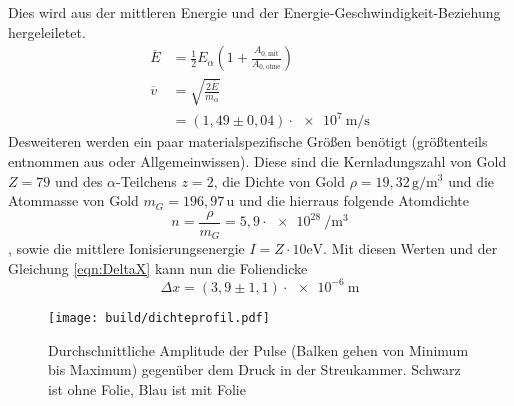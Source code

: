 Dies wird aus der mittleren Energie und der Energie-Geschwindigkeit-Beziehung hergeleiletet.
\begin{align}
  \overline{E} &= \frac{1}{2} E_{\alpha}\left(1 + \frac{A_{0,\text{mit}}}{A_{0,\text{ohne}}} \right)\\
  \overline{v} &= \sqrt{\frac{2\overline{E}}{m_{\alpha}}}\\
               &= (1,49 \pm 0,04)\cdot\SI{e+7}{\meter\per\second}
\end{align}
Desweiteren werden ein paar materialspezifische Größen benötigt (größtenteils entnommen aus \cite{Gold} oder Allgemeinwissen).
Diese sind die Kernladungszahl von Gold $Z=79$ und des $\alpha$-Teilchens $z=2$, die Dichte von Gold $\rho=19,32\, \si{\gram\per\meter\cubed}$
und die Atommasse von Gold $m_G=196,97\,\text{u}$ und die hierraus folgende Atomdichte
\begin{equation}
  n=\frac{\rho}{m_G}=5,9\cdot\SI{e+28}{\per\meter\cubed}
\end{equation}
, sowie die mittlere Ionisierungsenergie $I=Z\cdot 10\si{\electronvolt}$.
Mit diesen Werten und der Gleichung \eqref{eqn:DeltaX} kann nun die Foliendicke
\begin{equation}
  \Delta x = (3,9 \pm 1,1)\cdot\SI{e-6}{\meter}
\end{equation}

\begin{figure}
  \centering
  \texttt{[image: build/dichteprofil.pdf]}
  \caption{Durchschnittliche Amplitude der Pulse (Balken gehen von Minimum bis Maximum) gegenüber dem Druck in der Streukammer. Schwarz ist ohne Folie, Blau ist mit Folie}
  \label{fig:dichteprofil}
\end{figure}


